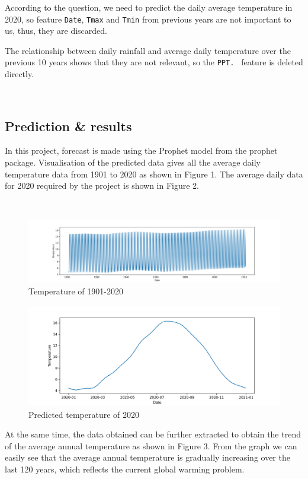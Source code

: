 \documentclass{article}
\begin{document}
According to the question, we need to predict the daily average temperature in 2020, so feature \verb|Date|, \verb|Tmax| and \verb|Tmin| from previous years are not important to us, thus, they are discarded.

The relationship between daily rainfall and average daily temperature over the previous 10 years shows that they are not relevant, so the \verb|PPT. | feature is deleted directly.

\ 

\subsection{Prediction \& results}

In this project, forecast is made using the Prophet model from the prophet package. Visualisation of the predicted data gives all the average daily temperature data from 1901 to 2020 as shown in Figure 1. The average daily data for 2020 required by the project is shown in Figure 2.

\ 

\begin{figure}[p]
\centering
\includegraphics[width=16.5cm]{wholeyears.png} %
\caption{Temperature of 1901-2020} %
\end{figure}

\begin{figure}[p]
\centering
\includegraphics[width=16cm]{year2020.png} %
\caption{Predicted temperature of 2020} %
\end{figure}


At the same time, the data obtained can be further extracted to obtain the trend of the average annual temperature as shown in Figure 3. From the graph we can easily see that the average annual temperature is gradually increasing over the last 120 years, which reflects the current global warming problem.
\end{document}
